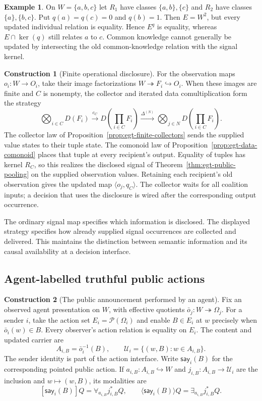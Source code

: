 \documentclass[11pt,a4paper]{article}
\numberwithin{equation}{section}
\theoremstyle{definition}
\newtheorem{example}[theorem]{Example}
\newtheorem{construction}[construction]{Construction}
\theoremstyle{remark}
\theoremstyle{plain}
\begin{document}
\begin{example}
On $W=\{a,b,c\}$ let $R_1$ have classes $\{a,b\},\{c\}$ and
$R_2$ have classes $\{a\},\{b,c\}$. Put $q(a)=q(c)=0$ and
$q(b)=1$. Then $E=W^2$, but every updated individual relation is
equality. Hence $E^q$ is equality, whereas $E\cap\ker(q)$ still
relates $a$ to $c$. Common knowledge cannot generally be updated by
intersecting the old common-knowledge relation with the signal kernel.
\end{example}

\begin{construction}[Finite operational disclosure]
\label{con:egt-finite-disclosure}
For the observation maps $o_i:W\to O_i$, take their image
factorizations $W\twoheadrightarrow F_i\hookrightarrow O_i$.
When these images are finite and $C$ is nonempty, the collector and
iterated data comultiplication form the strategy
\[
 \bigotimes_{i\in C}D(F_i)
 \xrightarrow{c_C}D\!\left(\prod_{i\in C}F_i\right)
 \xrightarrow{\Delta^{(N)}}
 \bigotimes_{j\in N}D\!\left(\prod_{i\in C}F_i\right).
\]
The collector law of Proposition~\ref{prop:egt-finite-collectors}
sends the supplied value states to their tuple state. The comonoid law
of Proposition~\ref{prop:egt-data-comonoid} places that tuple at every
recipient's output. Equality of tuples has kernel $R_C$, so this realizes
the disclosed signal of Theorem~\ref{thm:egt-public-pooling} on the
supplied observation values. Retaining each recipient's old observation
gives the updated map $\langle o_j,q_C\rangle$.
The collector waits for all coalition inputs; a decision that uses the
disclosure is wired after the corresponding output occurrence.
\end{construction}

The ordinary signal map specifies which information is disclosed. The
displayed strategy specifies how already supplied signal occurrences are
collected and delivered. This maintains the distinction between semantic
information and its causal availability at a decision interface.

\subsection{Agent-labelled truthful public actions}

\begin{construction}[The public announcement performed by an agent]
\label{con:egt-agent-authored-announcement}
Fix an observed agent presentation on $W$, with effective quotients
$\bar o_j:W\twoheadrightarrow\Omega_j$. For a sender $i$, take the action
set $E_i=\mathcal P(\Omega_i)$ and enable $B\in E_i$ at $w$ precisely when
$\bar o_i(w)\in B$. Every observer's action relation is equality on $E_i$.
The content and updated carrier are
\[
 A_{i,B}=\bar o_i^{-1}(B),\qquad
 \mathcal U_i=\{(w,B):w\in A_{i,B}\}.
\]
The sender identity is part of the action interface. Write
$\mathsf{say}_i(B)$ for the corresponding pointed public action. If
$a_{i,B}:A_{i,B}\hookrightarrow W$ and
$j_{i,B}:A_{i,B}\to\mathcal U_i$ are the inclusion and
$w\mapsto(w,B)$, its modalities are
\[
 [\mathsf{say}_i(B)]Q=\forall_{a_{i,B}}j_{i,B}^*Q,
 \qquad
 \langle\mathsf{say}_i(B)\rangle Q=\exists_{a_{i,B}}j_{i,B}^*Q.
\]
\end{construction}
\end{document}
